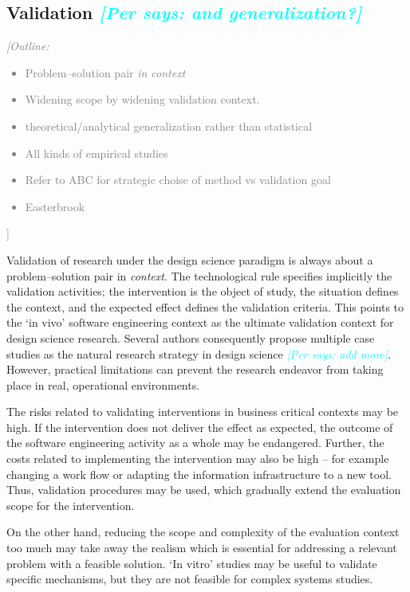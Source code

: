 \documentclass[graybox]{svmult}
\newcommand{\per}[1]{\textcolor{cyan}{{\it [Per says: #1]}}}
\newcommand{\outline}[1]{\textcolor{gray}{{\it [Outline: #1]}}}
\newcommand{\per}[1]{}
\newcommand{\outline}[1]{}
\begin{document}
{\subsection{Validation \per{and generalization?}}
\outline{
\begin{itemize}
\item Problem--solution pair \emph{in context}
\item Widening scope by widening validation context. 
\item theoretical/analytical generalization rather than statistical 
\item All kinds of empirical studies \cite{easterbrook_selecting_2008}\cite{Runeson12Case,WohlinExpBook12}
\item Refer to ABC \cite{StolABC18} for strategic choise of method vs validation goal 
\item Easterbrook \cite{easterbrook_selecting_2008}
\end{itemize}
}

Validation of research under the design science paradigm is always about a problem--solution pair in \emph{context}. The technological rule specifies implicitly the validation activities; the intervention is the object of study, the situation defines the context, and the expected effect defines the validation criteria. This points to the `in vivo' software engineering context as the ultimate validation context for design science research. Several authors consequently propose multiple case studies as the natural research strategy in design science \cite{van_aken_management_2004}\per{add more}. However, practical limitations can prevent the research endeavor from taking place in real, operational environments. 

The risks related to validating interventions in business critical contexts may be high. If the intervention does not deliver the effect as expected, the outcome of the software engineering activity as a whole may be endangered. Further, the costs related to implementing the intervention may also be high -- for example changing a work flow or adapting the information infrastructure to a new tool. Thus, validation procedures may be used, which gradually extend the evaluation scope for the intervention.

On the other hand, reducing the scope and complexity of the evaluation context too much may take away the realism which is essential for addressing a relevant problem with a feasible solution. `In vitro' studies may be useful to validate specific mechanisms, but they are not feasible for complex systems studies.  

}
\end{document}
